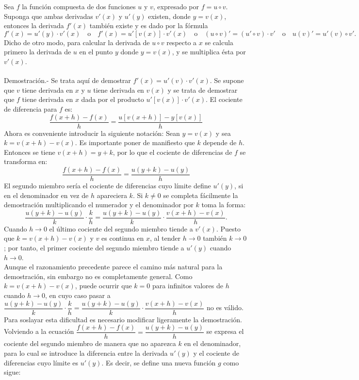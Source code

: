 \begin{teo}
    Sea $f$ la función compuesta de dos funciones $u$ y $v$, expresado por $f=u\circ v.$ Suponga que ambas derivadas $v'(x)$ y $u'(y)$ existen, donde $y=v(x)$, entonces la derivada $f'(x)$ también existe y es dado por la fórmula 
    $$f'(x)=u'(y)\cdot v'(x)\quad \mbox{o}\quad f'(x)=u'[v(x)]\cdot v'(x)\quad \mbox{o}\quad (u\circ v)'=(u'\circ v)\cdot v'\quad \mbox{o}\quad u(v)'=u'(v)\circ v'.$$
    Dicho de otro modo, para calcular la derivada de $u\circ v$ respecto a $x$ se calcula primero la derivada de $u$ en el punto $y$ donde $y=v(x)$, y se multiplica ésta por $v'(x)$.\\\\
	Demostración.-\;  Se trata aquí de demostrar $f'(x)=u'(v)\cdot v'(x)$. Se supone que $v$ tiene derivada en $x$ y $u$ tiene derivada en $v(x)$ y se trata de demostrar que $f$ tiene derivada en $x$ dada por el producto $u'\left[v(x)\right]\cdot v'(x)$. El cociente de diferencia para $f$ es:
	$$\dfrac{f(x+h)-f(x)}{h}=\dfrac{u\left[v(x+h)\right]-y\left[v(x)\right]}{h}$$
	Ahora es conveniente introducir la siguiente notación: Sean $y=v(x)$ y sea $k=v(x+h)-v(x)$. Es importante poner de manifiesto que $k$ depende de $h$. Entonces se tiene $v(x+h)=y+k$, por lo que el cociente de diferencias de $f$ se transforma en:
	$$\dfrac{f(x+h)-f(x)}{h}=\dfrac{u(y+k)-u(y)}{h}$$
	El segundo miembro sería el cociente de diferencias cuyo límite define $u'(y)$, si en el denominador en vez de $h$ apareciera $k$. Si $k\neq 0$ se completa fácilmente la demostración multiplicando el numerador y el denominador por $k$ toma la forma:
	$$\dfrac{u(y+k)-u(y)}{k}\cdot \dfrac{k}{h}=\dfrac{u(y+k)-u(y)}{k}\cdot \dfrac{v(x+h)-v(x)}{h}.$$
	Cuando $h\to 0$ el último cociente del segundo miembro tiende a $v'(x)$. Puesto que $k=v(x+h)-v(x)$ y $v$ es continua en $x$, al tender $h\to 0$ también $k\to 0$; por tanto, el primer cociente del segundo miembro tiende a $u'(y)$ cuando $h\to 0$.\\
	Aunque el razonamiento precedente parece el camino más natural para la demostración, sin embargo no es completamente general. Como $k=v(x+h)-v(x)$, puede ocurrir que $k=0$ para infinitos valores de $h$ cuando $h\to 0$, en cuyo caso pasar a $\dfrac{u(y+k)-u(y)}{k}\cdot \dfrac{k}{h}=\dfrac{u(y+k)-u(y)}{k}\cdot \dfrac{v(x+h)-v(x)}{h}$ no es válido. Para soslayar esta dificultad es necesario modificar ligeramente la demostración.\\
	Volviendo a la ecuación $\dfrac{f(x+h)-f(x)}{h}=\dfrac{u(y+k)-u(y)}{h}$ se expresa el cociente del segundo miembro de manera que no aparezca $k$ en el denominador, para lo cual se introduce la diferencia entre la derivada $u'(y)$ y el cociente de diferencias cuyo límite es $u'(y)$. Es decir, se define una nueva función $g$ como sigue:

\end{teo}
